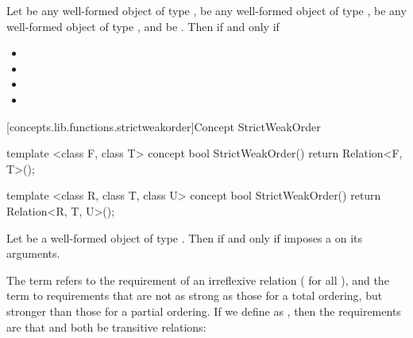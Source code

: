 \begin{addedblock}
\begin{itemdescr}
\pnum
Let  be any well-formed object of type ,  be any well-formed object of
type ,  be any well-formed object of type , and  be
. Then 
  if and only if

\begin{itemize}
\item {}
\item {}
\item {}
\item {}
\end{itemize}
\end{itemdescr}

[concepts.lib.functions.strictweakorder]{Concept StrictWeakOrder}

%
\begin{itemdecl}
template <class F, class T>
concept bool StrictWeakOrder() {
  return Relation<F, T>();
}

template <class R, class T, class U>
concept bool StrictWeakOrder() {
  return Relation<R, T, U>();
}
\end{itemdecl}

\begin{itemdescr}
\pnum
Let  be a well-formed object of type . Then    if and only if
 imposes a  on its arguments.


{\color{black}
\pnum
The term
refers to the
requirement of an irreflexive relation ( for all ),
and the term
to requirements that are not as strong as
those for a total ordering,
but stronger than those for a partial
ordering.
If we define
as
,
then the requirements are that
and
both be transitive  relations:

}
\end{itemdescr}
\end{addedblock}
